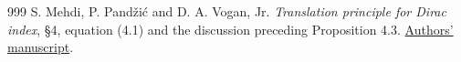 \documentclass[11pt]{article}
\theoremstyle{definition}
\theoremstyle{plain}
\begin{document}
\begin{thebibliography}{999}
S. Mehdi, P. Pand\v zi\'c and D. A. Vogan, Jr.
\emph{Translation principle for Dirac index}, \S4, equation (4.1)
and the discussion preceding Proposition 4.3.
\href{https://math.mit.edu/~dav/index_translation_2April2016.pdf}{Authors' manuscript}.

\end{thebibliography}
\end{document}
